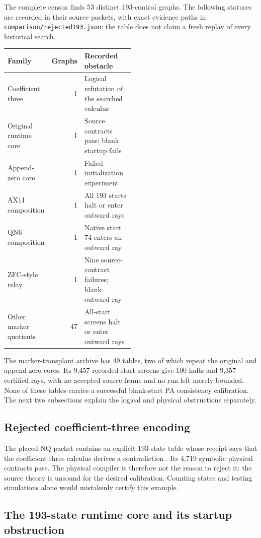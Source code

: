 \documentclass[11pt,letterpaper]{article}
\newcommand{\file}[1]{\texttt{\nolinkurl{#1}}}
\begin{document}
The complete census finds 53 distinct 193-control graphs. The following
statuses are recorded in their source packets, with exact evidence paths
in \file{comparison/rejected193.json}; the table does not claim a fresh
replay of every historical search.
\begin{center}
\begin{tabular}{@{}lrp{0.50\linewidth}@{}}
\toprule Family & Graphs & Recorded obstacle\\\midrule
Coefficient three &1& Logical refutation of the searched calculus\\
Original runtime core &1& Source contracts pass; blank startup fails\\
Append-zero core &1& Failed initialization experiment\\
AX11 composition &1& All 193 starts halt or enter outward rays\\
QN6 composition &1& Native start 74 enters an outward ray\\
ZFC-style relay &1& Nine source-contract failures; blank outward ray\\
Other marker quotients &47& All-start screens halt or enter outward rays\\
\bottomrule
\end{tabular}
\end{center}
The marker-transplant archive has 49 tables, two of which repeat the
original and append-zero cores. Its 9,457 recorded start screens give
100 halts and 9,357 certified rays, with no accepted source frame and
no run left merely bounded. None of these tables carries a successful
blank-start PA consistency calibration. The next two subsections explain
the logical and physical obstructions separately.

\subsection{Rejected coefficient-three encoding}

The placed NQ packet contains an explicit 193-state table whose
receipt says that the coefficient-three calculus derives a
contradiction \cite{rejected193}. Its 4,719 symbolic physical
contracts pass. The physical compiler is therefore not the
reason to reject it: the source theory is unsound for the desired
calibration. Counting states and testing simulations alone would
mistakenly certify this example.

\subsection{The 193-state runtime core and its startup obstruction}
\label{sec:core193}
\end{document}
